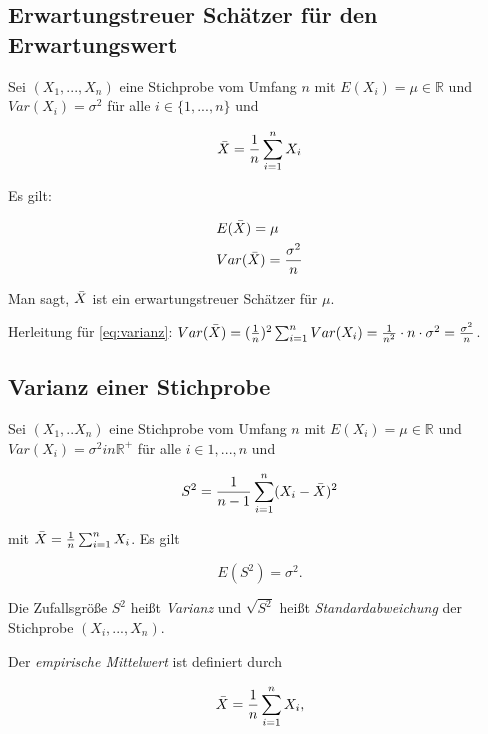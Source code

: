 \documentclass{tufte-handout}
\theoremstyle{own}
\begin{document}
\subsection{Erwartungstreuer Schätzer für den Erwartungswert}

Sei $(X_1,...,X_n)$ eine Stichprobe vom Umfang $n$ mit $E(X_i) = \mu \in \mathbb{R}$
und $Var(X_i) = \sigma^2$ für alle $i \in \{1,...,n\}$ und

\begin{equation*}
	\Bar{X} = \frac{1}{n} \sum_{i=1}^n X_i
\end{equation*}

Es gilt:

\begin{align}
&E(\Bar{X}) = \mu \\
&Var(\Bar{X}) = \frac{\sigma^2}{n} \label{eq:varianz}
\end{align}

Man sagt, $\Bar{X}$ ist ein erwartungstreuer Schätzer für $\mu$.

Herleitung für \eqref{eq:varianz}: $Var(\Bar{X}) = (\frac{1}{n})^2 \sum_{i=1}^n Var(X_i)
 = \frac{1}{n^2} \cdot n \cdot \sigma^2 = \frac{\sigma^2}{n}$.

\subsection{Varianz einer Stichprobe}

Sei $(X_1,..X_n)$ eine Stichprobe vom Umfang $n$ mit $E(X_i) = \mu \in \mathbb{R}$
und $Var(X_i) = \sigma^2 in \mathbb{R}^{+}$ für alle $i \in 1,...,n$ und

\begin{equation}
	S^2 = \frac{1}{n-1} \sum_{i=1}^n (X_i - \Bar{X})^2
\end{equation}

mit $\Bar{X} = \frac{1}{n} \sum_{i=1}^n X_i$. Es gilt

\begin{equation}
	E(S^2) = \sigma^2.
\end{equation}

Die Zufallsgröße $S^2$ heißt \emph{Varianz} und $\sqrt{S^2}$ heißt
\emph{Standardabweichung} der Stichprobe $(X_i,...,X_n)$.

Der \emph{empirische Mittelwert} ist definiert durch

\begin{equation}
	\Bar{X} = \frac{1}{n} \sum_{i=1}^n X_i,
\end{equation}
\end{document}
